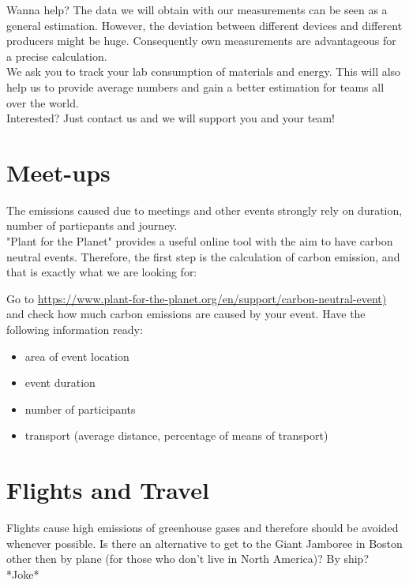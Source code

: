 \begin{suggest}{Wanna help?}
	The data we will obtain with our measurements can be seen as a general estimation.
	However, the deviation between different devices and different producers might be huge. Consequently own measurements are advantageous for a precise calculation.\\
	We ask you to track your lab consumption of materials and energy. This will also help us to provide average numbers and gain a better estimation for teams all over the world. \\
	Interested? Just contact us and we will support you and your team!
	
\end{suggest}

\section{Meet-ups}

The emissions caused due to meetings and other events strongly rely on duration, number of particpants and journey. \\
"Plant for the Planet" provides a useful online tool with the aim to have carbon neutral events. Therefore, the first step is the calculation of carbon emission, and that is exactly what we are looking for:

\begin{suggest} {}
	Go to \url{https://www.plant-for-the-planet.org/en/support/carbon-neutral-event)} and check how much carbon emissions are caused by your event. Have the following information ready:
	\begin{itemize}
		\item area of event location
		\item event duration
		\item number of participants
		\item transport (average distance, percentage of means of transport)
	\end{itemize}
\end{suggest}


\section{Flights and Travel}
Flights cause high emissions of greenhouse gases and therefore should be avoided whenever possible. Is there an alternative to get to the Giant Jamboree in Boston other then by plane (for those who don't live in North America)? By ship? *Joke* 


